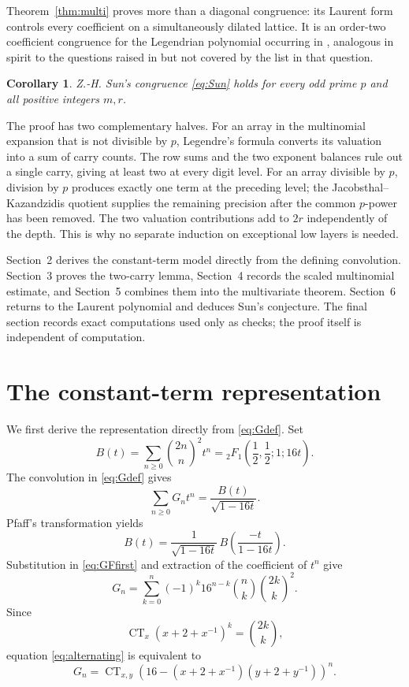 \documentclass[11pt,reqno]{amsart}
\numberwithin{equation}{section}
\newtheorem{corollary}[theorem]{Corollary}
\theoremstyle{remark}
\newcommand{\CT}{\operatorname {CT}}
\begin{document}
Theorem~\ref{thm:multi} proves more than a diagonal congruence: its Laurent
form controls every coefficient on a simultaneously dilated lattice.  It is
an order-two coefficient congruence for the Legendrian polynomial occurring
in \cite[(5.2)]{GorodetskyV2}, analogous in spirit to the questions raised in
\cite[(6.2)]{GorodetskyV2} but not covered by the list in that question.

\begin{corollary}\label{cor:Sun}
Z.-H. Sun's congruence \eqref{eq:Sun} holds for every odd prime \(p\) and
all positive integers \(m,r\).
\end{corollary}

The proof has two complementary halves.  For an array in the multinomial
expansion that is not divisible by \(p\), Legendre's formula converts its
valuation into a sum of carry counts.  The row sums and the two exponent
balances rule out a single carry, giving at least two at every digit level.
For an array divisible by \(p\), division by \(p\) produces exactly one term
at the preceding level; the Jacobsthal--Kazandzidis quotient supplies the
remaining precision after the common \(p\)-power has been removed.  The two
valuation contributions add to \(2r\) independently of the depth.  This is
why no separate induction on exceptional low layers is needed.

Section~2 derives the constant-term model directly from the defining
convolution.  Section~3 proves the two-carry lemma, Section~4 records the
scaled multinomial estimate, and Section~5 combines them into the
multivariate theorem.  Section~6 returns to the Laurent polynomial and
deduces Sun's conjecture.  The final section records exact computations used
only as checks; the proof itself is independent of computation.

\section{The constant-term representation}

We first derive the representation directly from \eqref{eq:Gdef}.  Set
\[
B(t)=\sum_{n\geq0}\binom{2n}{n}^{\!2}t^n
={}_2F_1\left(\frac12,\frac12;1;16t\right).
\]
The convolution in \eqref{eq:Gdef} gives
\begin{equation}\label{eq:GFfirst}
\sum_{n\geq0}G_nt^n=\frac{B(t)}{\sqrt{1-16t}}.
\end{equation}
Pfaff's transformation yields
\[
B(t)=\frac1{\sqrt{1-16t}}\,
B\left(\frac{-t}{1-16t}\right).
\]
Substitution in \eqref{eq:GFfirst} and extraction of the coefficient of
\(t^n\) give
\begin{equation}\label{eq:alternating}
G_n=\sum_{k=0}^n(-1)^k16^{n-k}
\binom nk\binom{2k}{k}^{\!2}.
\end{equation}
Since
\[
\CT_x(x+2+x^{-1})^k=\binom{2k}{k},
\]
equation \eqref{eq:alternating} is equivalent to
\begin{equation}\label{eq:CTsimple}
G_n=\CT_{x,y}
\left(16-(x+2+x^{-1})(y+2+y^{-1})\right)^n.
\end{equation}
\end{document}
